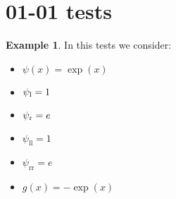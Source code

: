 \documentclass[11pt,a4paper]{article}
\author{}
\title{}
\theoremstyle{plain}
\theoremstyle{definition}
\newtheorem{exmp}[thm]{Example} %
\begin{document}
\section{01-01 tests}

\begin{exmp}
\label{Example:PRO:bending:01_01_glob1}
In this tests we consider:
\begin{itemize}
\item $\psi(x)=\exp(x)$
\item $\psi_\text l=1$
\item $\psi_\text r=e$
\item $\psi_\text{ll}=1$
\item $\psi_\text{rr}=e$
\item $g(x)=-\exp(x)$
\end{itemize}
\end{exmp}
%

\end{document}
